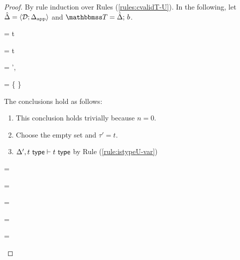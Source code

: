 \begin{proof}
By rule induction over Rules (\ref{rules:cvalidT-U}). In the following, let $\hat{\Delta} = \langle \mathcal{D}; \Delta_\text{app} \rangle$ and $\tscenev=\tsceneU{\uDelta}{b}$.
\begin{byCases}
  \item[\text{(\ref{rule:cvalidT-U-tvar})}] 
    \begin{pfsteps}
    \item \ctau = t 
    \item \tau = t 
    \item \Delta = \Delta',  
    \item \summaryOf{\ctau} = \{ \} 
    \end{pfsteps}
    \resetpfcounter
    The conclusions hold as follows:
    \begin{enumerate}
    \item This conclusion holds trivially because $n=0$.
    \item Choose the empty set and $\tau'=t$.
    \item $\Delta', t~\mathsf{type} \vdash t~\mathsf{type}$ by Rule (\ref{rule:istypeU-var})
    \end{enumerate}
  \item[\text{(\ref{rule:cvalidT-U-parr})}] 
    \begin{pfsteps}
    \item \ctau =  
    \item \tau =  
    \item {}  
    \item {}  
    \item \summaryOf{\ctau} =  \cup {}  
    \item {} =   
    \item {} =   
    \item {} 

\end{pfsteps}
\end{byCases}
\end{proof}
